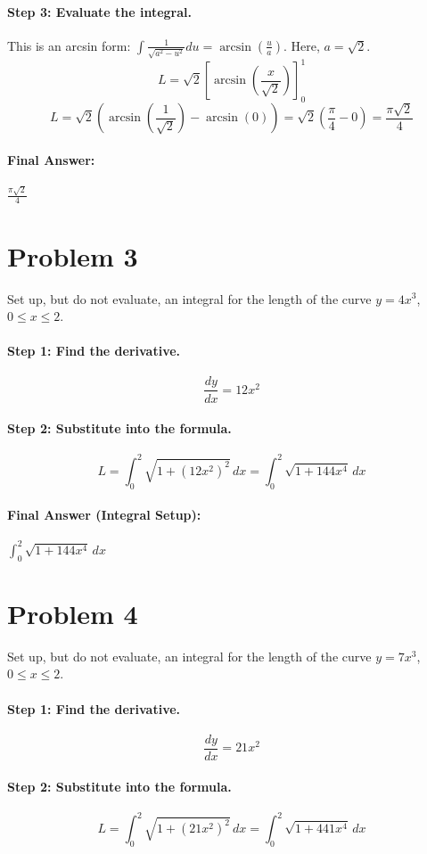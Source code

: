 \documentclass{article}
\begin{document}
\paragraph{Step 3: Evaluate the integral.}
This is an arcsin form: $\int \frac{1}{\sqrt{a^2 - u^2}} du = \arcsin(\frac{u}{a})$. Here, $a = \sqrt{2}$.
\[ L = \sqrt{2} [\arcsin(\frac{x}{\sqrt{2}})]_{0}^{1} \]
\[ L = \sqrt{2} (\arcsin(\frac{1}{\sqrt{2}}) - \arcsin(0)) = \sqrt{2} (\frac{\pi}{4} - 0) = \frac{\pi\sqrt{2}}{4} \]

\paragraph{Final Answer:} $\frac{\pi\sqrt{2}}{4}$

\section*{Problem 3}
Set up, but do not evaluate, an integral for the length of the curve $y = 4x^3$, $0 \le x \le 2$.

\paragraph{Step 1: Find the derivative.}
\[ \frac{dy}{dx} = 12x^2 \]

\paragraph{Step 2: Substitute into the formula.}
\[ L = \int_{0}^{2} \sqrt{1 + (12x^2)^2} \,dx = \int_{0}^{2} \sqrt{1 + 144x^4} \,dx \]

\paragraph{Final Answer (Integral Setup):} $\int_{0}^{2} \sqrt{1 + 144x^4} \,dx$

\section*{Problem 4}
Set up, but do not evaluate, an integral for the length of the curve $y = 7x^3$, $0 \le x \le 2$.

\paragraph{Step 1: Find the derivative.}
\[ \frac{dy}{dx} = 21x^2 \]

\paragraph{Step 2: Substitute into the formula.}
\[ L = \int_{0}^{2} \sqrt{1 + (21x^2)^2} \,dx = \int_{0}^{2} \sqrt{1 + 441x^4} \,dx \]
\end{document}
